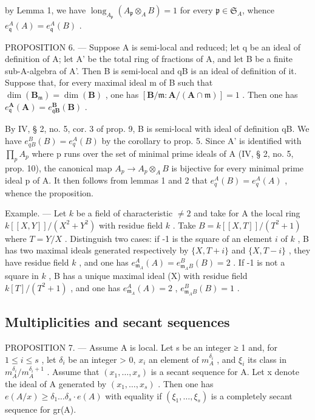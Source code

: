 by Lemma 1, we have \(\operatorname{long}_{A_{\mathfrak{p}}}(A_{\mathfrak{p}} \otimes_{A} B) = 1\) for every \(\mathfrak{p} \in \mathfrak{S}_{A}\), whence \(e_{\mathfrak{q}}^{A}(A) = e_{\mathfrak{q}}^{A}(B)\) .

PROPOSITION 6. --- Suppose A is semi-local and reduced; let q be an ideal of definition of A; let A' be the total ring of fractions of A, and let B be a finite sub-A-algebra of A'. Then B is semi-local and qB is an ideal of definition of it. Suppose that, for every maximal ideal m of B such that \(\dim(\mathbf{B}_{\mathfrak{m}})=\dim(\mathbf{B})\) , one has \([\mathbf{B}/\mathfrak{m}:\mathbf{A}/(\mathbf{A}\cap\mathfrak{m})]=1\) . Then one has \(e_{\mathfrak{q}}^{\mathbf{A}}(\mathbf{A})=e_{\mathfrak{q}\mathbf{B}}^{\mathbf{B}}(\mathbf{B})\) .

By IV, § 2, no. 5, cor. 3 of prop. 9, B is semi-local with ideal of definition qB. We have \(e_{qB}^{B}(B) = e_{q}^{A}(B)\) by the corollary to prop. 5. Since A' is identified with \(\prod_{p} A_p\) where p runs over the set of minimal prime ideals of A (IV, § 2, no. 5, prop. 10), the canonical map \(A_{p} \to A_{p} \otimes_{A} B\) is bijective for every minimal prime ideal p of A. It then follows from lemmas 1 and 2 that \(e_{q}^{A}(B) = e_{q}^{A}(A)\) , whence the proposition.

Example. --- Let \(k\) be a field of characteristic \(\neq 2\) and take for A the local ring \(k[[X, Y]]/(X^{2} + Y^{2})\) with residue field \(k\) . Take \(B = k[[X, T]]/(T^{2} + 1)\) where \(T = Y/X\) . Distinguish two cases: if -1 is the square of an element \(i\) of \(k\) , B has two maximal ideals generated respectively by \(\{X, T + i\}\) and \(\{X, T - i\}\) , they have residue field \(k\) , and one has \(e_{\mathfrak{m}_{A}}^{A}(A) = e_{\mathfrak{m}_{A}B}^{B}(B) = 2\) . If -1 is not a square in \(k\) , B has a unique maximal ideal (X) with residue field \(k[T]/(T^{2} + 1)\) , and one has \(e_{\mathfrak{m}_{A}}^{A}(A) = 2\) , \(e_{\mathfrak{m}_{A}B}^{B}(B) = 1\) .

\subsection{Multiplicities and secant sequences}

PROPOSITION 7. --- Assume A is local. Let s be an integer ≥ 1 and, for \(1 \leqslant i \leqslant s\) , let \(\delta_{i}\) be an integer \textgreater{} 0, \(x_{i}\) an element of \(m_{A}^{\delta_{i}}\) , and \(\xi_{i}\) its class in \(m_{A}^{\delta_{i}}/m_{A}^{\delta_{i}+1}\) . Assume that \((x_{1}, \ldots, x_{s})\) is a secant sequence for A. Let x denote the ideal of A generated by \((x_{1}, \ldots, x_{s})\) . Then one has \(e(A/x) \geqslant \delta_{1} \ldots \delta_{s} \cdot e(A)\) with equality if \((\xi_{1}, \ldots, \xi_{s})\) is a completely secant sequence for gr(A).

